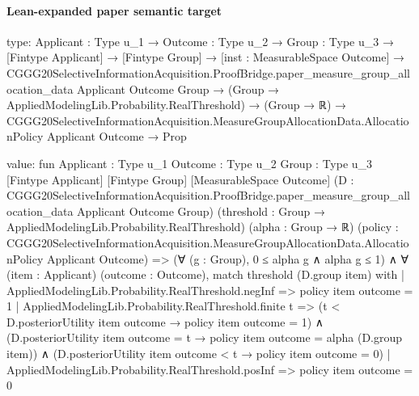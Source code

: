 \documentclass[10pt]{article}
\begin{document}
\paragraph{Lean-expanded paper semantic target}
\begin{ReviewVerbatim}
type:
{Applicant : Type u_1} →
  {Outcome : Type u_2} →
    {Group : Type u_3} →
      [Fintype Applicant] →
        [Fintype Group] →
          [inst : MeasurableSpace Outcome] →
            CGGG20SelectiveInformationAcquisition.ProofBridge.paper_measure_group_allocation_data Applicant Outcome
                Group →
              (Group → AppliedModelingLib.Probability.RealThreshold) →
                (Group → ℝ) →
                  CGGG20SelectiveInformationAcquisition.MeasureGroupAllocationData.AllocationPolicy Applicant Outcome →
                    Prop

value:
fun {Applicant : Type u_1} {Outcome : Type u_2} {Group : Type u_3} [Fintype Applicant] [Fintype Group]
    [MeasurableSpace Outcome]
    (D : CGGG20SelectiveInformationAcquisition.ProofBridge.paper_measure_group_allocation_data Applicant Outcome Group)
    (threshold : Group → AppliedModelingLib.Probability.RealThreshold) (alpha : Group → ℝ)
    (policy : CGGG20SelectiveInformationAcquisition.MeasureGroupAllocationData.AllocationPolicy Applicant Outcome) =>
  (∀ (g : Group), 0 ≤ alpha g ∧ alpha g ≤ 1) ∧
    ∀ (item : Applicant) (outcome : Outcome),
      match threshold (D.group item) with
      | AppliedModelingLib.Probability.RealThreshold.negInf => policy item outcome = 1
      | AppliedModelingLib.Probability.RealThreshold.finite t =>
        (t < D.posteriorUtility item outcome → policy item outcome = 1) ∧
          (D.posteriorUtility item outcome = t → policy item outcome = alpha (D.group item)) ∧
            (D.posteriorUtility item outcome < t → policy item outcome = 0)
      | AppliedModelingLib.Probability.RealThreshold.posInf => policy item outcome = 0
\end{ReviewVerbatim}
\end{document}
